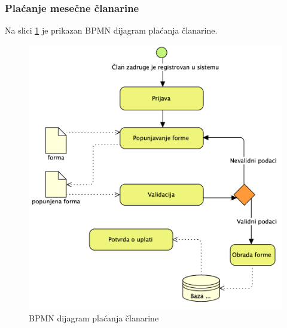 \documentclass[a4paper, oneside]{article}
\begin{document}
\subsubsection{Plaćanje mesečne članarine}
Na slici \ref{bpmn_mesecna_clanarina} je prikazan BPMN dijagram plaćanja članarine.
\begin{figure}[h!]
    \centering
    \includegraphics[scale=0.64]{images/bpmn_mesecna_clanarina.png}
    \caption{BPMN dijagram plaćanja članarine}
    \label{bpmn_mesecna_clanarina}
\end{figure}
\clearpage
\end{document}
